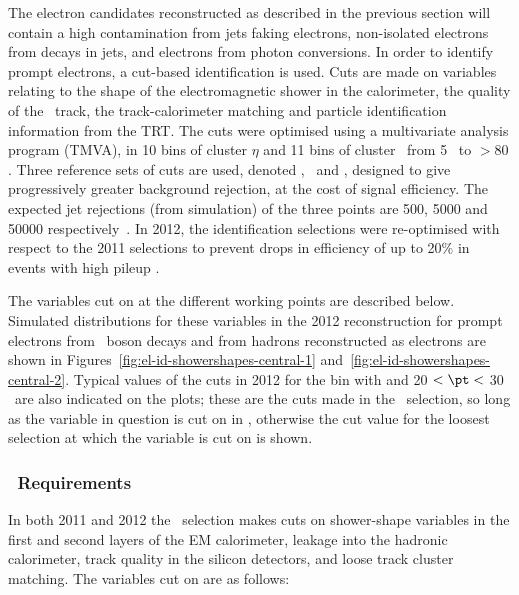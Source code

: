 The electron candidates reconstructed as described in the previous section will
contain a high contamination from jets faking electrons, non-isolated electrons
from decays in jets, and electrons from photon conversions. In order to identify
prompt electrons, a cut-based identification is used. Cuts are made on variables
relating to the shape of the electromagnetic shower in the calorimeter, the
quality of the \id\ track, the track-calorimeter matching and particle
identification information from the TRT. The cuts were optimised using a
multivariate analysis program (TMVA), in 10 bins of cluster $\eta$ and 11 bins
of cluster \et\ from 5 \gev\ to $>80$ \gev.  Three reference sets of cuts are
used, denoted \loosePP, \mediumPP\ and \tightPP, designed to give progressively
greater background rejection, at the cost of signal efficiency. The expected jet
rejections (from simulation) of the three points are 500, 5000 and 50000
respectively~\cite{ATL-PHYS-PUB-2011-006}. In 2012, the identification
selections were re-optimised with respect to the 2011 selections to prevent
drops in efficiency of up to 20\% in events with high pileup . 


The variables cut on at the different working points are described below.
Simulated distributions for these variables in the 2012 reconstruction for
prompt electrons from \Z\ boson decays and from hadrons reconstructed as
electrons are shown in Figures~\ref{fig:el-id-showershapes-central-1}
and~\ref{fig:el-id-showershapes-central-2}. Typical values of the cuts in 2012
for the bin with  and 20 \gev $< \pt <$ 30 \gev\ are
also indicated on the plots; these are the cuts made in the \loosePP\ selection,
so long as the variable in question is cut on in \loosePP, otherwise the cut
value for the loosest selection at which the variable is cut on is shown.

\subsubsection{\loosePP\ Requirements}

In both 2011 and 2012 the \loosePP\ selection makes cuts on shower-shape
variables in the first and second layers of the EM calorimeter, leakage into the
hadronic calorimeter, track quality in the silicon detectors, and loose track
cluster matching. The variables cut on are as follows:

